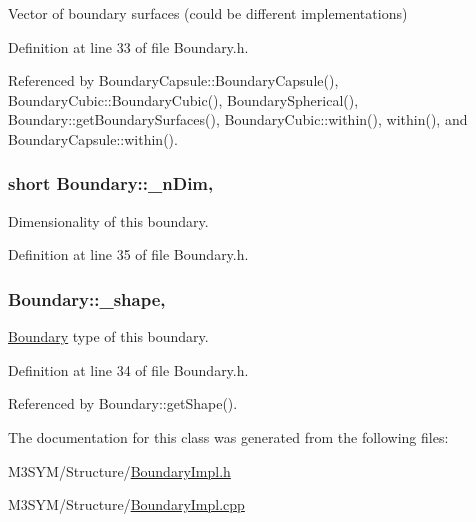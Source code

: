 Vector of boundary surfaces (could be different implementations) 



Definition at line 33 of file Boundary.\+h.



Referenced by Boundary\+Capsule\+::\+Boundary\+Capsule(), Boundary\+Cubic\+::\+Boundary\+Cubic(), Boundary\+Spherical(), Boundary\+::get\+Boundary\+Surfaces(), Boundary\+Cubic\+::within(), within(), and Boundary\+Capsule\+::within().

\hypertarget{classBoundary_a96f2294e0c822ab216fe5ab7e17258c7}{
\subsubsection[{\+\_\+n\+Dim}]{\setlength{\rightskip}{0pt plus 5cm}short Boundary\+::\+\_\+n\+Dim\hspace{0.3cm}{\ttfamily [protected]}, {\ttfamily [inherited]}}}\label{classBoundary_a96f2294e0c822ab216fe5ab7e17258c7}


Dimensionality of this boundary. 



Definition at line 35 of file Boundary.\+h.

\hypertarget{classBoundary_a04c10c9a7aea1924d779d392e29f94ff}{
\subsubsection[{\+\_\+shape}]{ Boundary\+::\+\_\+shape\hspace{0.3cm}{\ttfamily [protected]}, {\ttfamily [inherited]}}}\label{classBoundary_a04c10c9a7aea1924d779d392e29f94ff}


\hyperlink{classBoundary}{Boundary} type of this boundary. 



Definition at line 34 of file Boundary.\+h.



Referenced by Boundary\+::get\+Shape().



The documentation for this class was generated from the following files\+:\begin{DoxyCompactItemize}
\item 
M3\+S\+Y\+M/\+Structure/\hyperlink{BoundaryImpl_8h}{Boundary\+Impl.\+h}\item 
M3\+S\+Y\+M/\+Structure/\hyperlink{BoundaryImpl_8cpp}{Boundary\+Impl.\+cpp}\end{DoxyCompactItemize}
